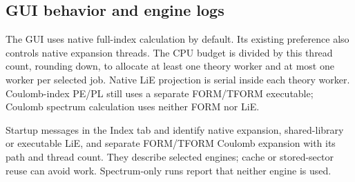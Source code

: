 \subsection{GUI behavior and engine logs}
The GUI uses native full-index calculation by default. Its existing
 preference also controls native expansion threads.
The CPU budget is divided by this thread count, rounding down, to allocate
at least one theory worker and at most one worker per selected job.
Native LiE projection is serial inside each theory worker. Coulomb-index
PE/PL still uses a separate FORM/TFORM executable; Coulomb spectrum calculation
uses neither FORM nor LiE.

Startup messages in the Index tab and  identify
native expansion, shared-library or executable LiE, and separate FORM/TFORM
Coulomb expansion with its path and thread count. They describe selected
engines; cache or stored-sector reuse can avoid work. Spectrum-only runs
report that neither engine is used.
\endgroup
